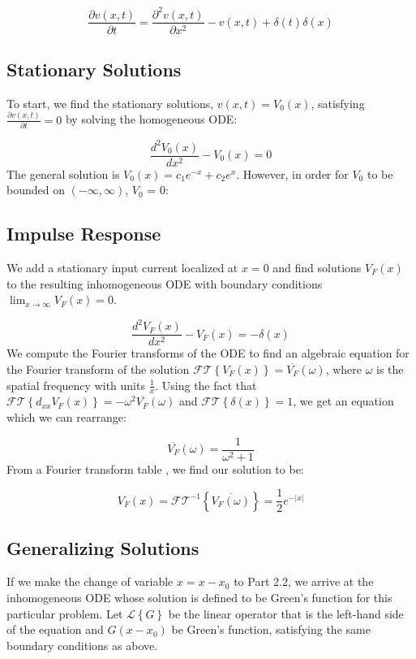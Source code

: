 \documentclass[12pt]{article}
\begin{document}
\begin{equation} \label{pm}
\frac{\partial{v(x,t)}}{\partial{t}}=\frac{\partial^2{v(x,t)}}{\partial{x}^2}-v(x,t)+\delta(t)\delta(x)
\end {equation}

\subsection{Stationary Solutions}
To start, we find the stationary solutions, $v(x,t) = V_0(x)$, satisfying $\frac{\partial{v(x,t)}}{\partial{t}} = 0$ by solving the homogeneous ODE:

\begin{equation} \label{pm_odeH}
\frac{d^2{V_0(x)}}{d{x^2}} - V_0(x) = 0
\end{equation}
The general solution is $V_0(x) = c_1e^{-x} + c_2e^{x}$. However, in order for $V_0$ to be bounded on $(-\infty, \infty)$, $V_0$ = 0:

\subsection{Impulse Response}
We add a stationary input current localized at $x=0$ and find solutions $V_F(x)$ to the resulting inhomogeneous ODE with boundary conditions $\lim_{x\to\infty} V_F(x) = 0$.

\begin{equation} \label{pm_odeN}
\frac{d^2{V_F(x)}}{d{x^2}} - V_F(x) = -\delta(x)
\end{equation}
We compute the Fourier transforms of the ODE to find an algebraic equation for the Fourier transform of the solution $\mathcal{FT}\left\{V_F(x)\right\} = \overline{V_F}(\omega)$, where $\omega$ is the spatial frequency with units $\frac{1}{x}$. Using the fact that $\mathcal{FT}\left\{d_{xx}V_F(x)\right\} = -\omega^2\overline{V_F}(\omega)$ and $ \mathcal{FT}\left\{\delta(x)\right\} = 1$, we get an equation which we can rearrange:

$$  \overline{V_F}(\omega) = \frac{1}{\omega^2+1} $$
From a Fourier transform table \cite{fourier}, we find our solution to be:

$$ V_F(x) = \mathcal{FT}^{-1}\left\{\overline{V_F(\omega)}\right\} =  \frac{1}{2}e^{-|x|} $$

\subsection{Generalizing Solutions}
If we make the change of variable $x = x-x_0$ to Part 2.2, we arrive at the inhomogeneous ODE whose solution is defined to be Green's function for this particular problem. Let $\mathcal{L}\left\{G\right\}$ be the linear operator that is the left-hand side of the equation and $G(x-x_0)$ be Green's function, satisfying the same boundary conditions as above.
\end{document}
